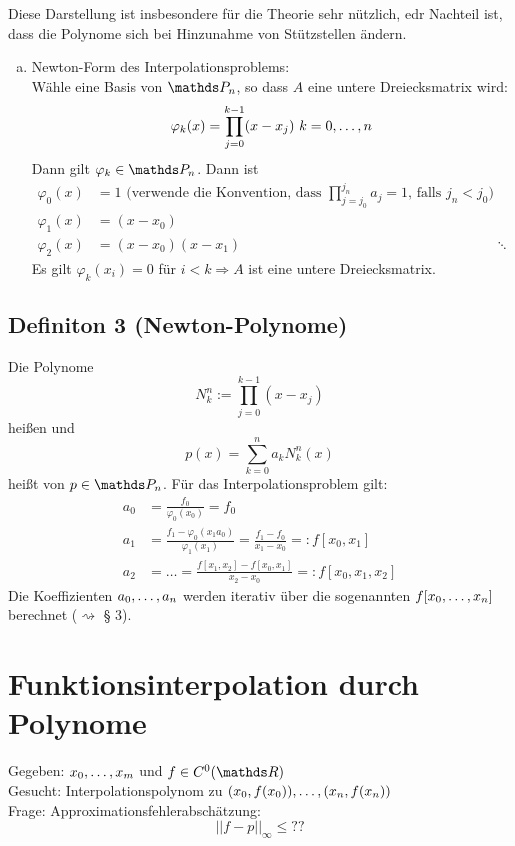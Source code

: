 Diese Darstellung ist insbesondere für die Theorie sehr nützlich, edr Nachteil ist, dass die Polynome sich bei Hinzunahme von Stützstellen ändern.

\begin{enumerate}[(b)]
	\item Newton-Form des Interpolationsproblems:\\
	Wähle eine Basis von $\Pw_n$, so dass $A$ eine untere Dreiecksmatrix wird:
	\[
	\varphi_k(x)= \prod_{j=0}^{k-1}(x-x_j) ~k=0, \dots ,n
	\]
	Dann gilt $\varphi_k\in \Pw_n$.
	Dann ist 
	\begin{equation*}
	\begin{aligned}
		\varphi_0(x)&=1 \text{ (verwende die Konvention, dass $\prod_{j=j_0}^{j_n}a_j=1$, falls $j_n<j_0)$}\\
		\varphi_1(x)&=(x-x_0)\\
		\varphi_2(x)&=(x-x_0)(x-x_1)
		&\ddots
	\end{aligned}
	\end{equation*}
	Es gilt $\varphi_k(x_i)=0$ für $i<k \Rightarrow A$ ist eine untere Dreiecksmatrix.
\end{enumerate}

\subsection{Definiton 3 (Newton-Polynome)}
\label{sub:def_3}
Die Polynome
\[
N_k^n:= \prod_{j=0}^{k-1}(x-x_j)
\]
heißen  und 
\[
p(x)=\sum_{k=0}^{n}a_kN_k^n(x)
\]
heißt  von $p\in \Pw_n$.
Für das Interpolationsproblem gilt:
\begin{equation*}
\begin{aligned}
	a_0&= \frac{f_0}{\varphi_0(x_0)}=f_0\\
	a_1&= \frac{f_1-\varphi_0(x_1a_0)}{\varphi_1(x_1)}=\frac{f_1-f_0}{x_1-x_0}=: f[x_0,x_1]\\
	a_2 &= \dots = \frac{f[x_1,x_2]-f[x_0,x_1]}{x_2-x_0} =: f[x_0,x_1,x_2]
\end{aligned}
\end{equation*}
Die Koeffizienten $a_0, \dots ,a_n$ werden iterativ über die sogenannten  $f[x_0, \dots ,x_n]$ berechnet ($\rightsquigarrow$ § 3).

\section{Funktionsinterpolation durch Polynome}
\label{sec:funktionsinterpolation}
Gegeben: $x_0, \dots ,x_m$ und $f\in C^0(\R)$\\
Gesucht: Interpolationspolynom zu $(x_0,f(x_0)), \dots ,(x_n,f(x_n))$\\
Frage: Approximationsfehlerabschätzung:
\[
||f-p||_{\infty}\le ??
\]

